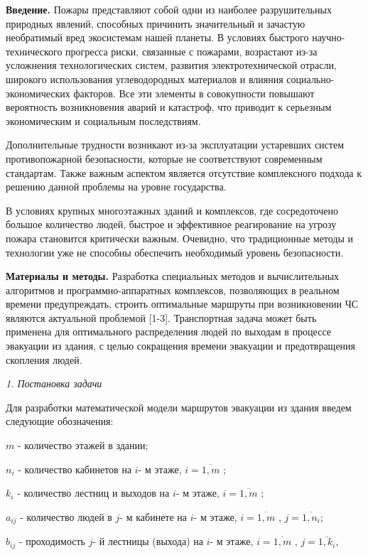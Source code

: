 \begin{multicols}{2}
{\bfseries Введение.} Пожары представляют собой одни из наиболее
разрушительных природных явлений, способных причинить значительный и
зачастую необратимый вред экосистемам нашей планеты. В условиях быстрого
научно-технического прогресса риски, связанные с пожарами, возрастают
из-за усложнения технологических систем, развития электротехнической
отрасли, широкого использования углеводородных материалов и влияния
социально-экономических факторов. Все эти элементы в совокупности
повышают вероятность возникновения аварий и катастроф, что приводит к
серьезным экономическим и социальным последствиям.

Дополнительные трудности возникают из-за эксплуатации устаревших систем
противопожарной безопасности, которые не соответствуют современным
стандартам. Также важным аспектом является отсутствие комплексного
подхода к решению данной проблемы на уровне государства.

В условиях крупных многоэтажных зданий и комплексов, где сосредоточено
большое количество людей, быстрое и эффективное реагирование на угрозу
пожара становится критически важным. Очевидно, что традиционные методы и
технологии уже не способны обеспечить необходимый уровень безопасности.

{\bfseries Материалы и методы.} Разработка специальных методов и
вычислительных алгоритмов и программно-аппаратных комплексов,
позволяющих в реальном времени предупреждать, строить оптимальные
маршруты при возникновении ЧС являются актуальной проблемой {[}1-3{]}.
Транспортная задача может быть применена для оптимального распределения
людей по выходам в процессе эвакуации из здания, с целью сокращения
времени эвакуации и предотвращения скопления людей.

\emph{1. Постановка задачи}

Для разработки математической модели маршрутов эвакуации из здания
введем следующие обозначения:

\(m\) - количество этажей в здании;

\(n_{i}\) - количество кабинетов на \(i\)- м этаже,
\(i = \overline{1,m}\) ;

\(k_{i}\) - количество лестниц и выходов на \(i\)- м этаже,
\(i = \overline{1,m}\) ;

\(a_{ij}\) - количество людей в \(j\)- м кабинете на \(i\)- м этаже,
\(i = \overline{1,m}\) , \(j = \overline{1,n_{i}}\);

\(b_{ij}\) - проходимость \(j\)- й лестницы (выхода) на \(i\)- м этаже,
\(i = \overline{1,m}\) , \(j = \overline{1,k_{i}}\),


\end{multicols}
